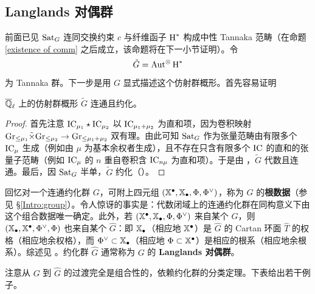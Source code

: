 
\subsection{Langlands 对偶群}\label{MV semiinfinite}

前面已见 ${\operatorname{Sat}}_G$ 连同交换约束 $c$ 与纤维函子 $\operatorname{H}^*$ 构成中性 Tannaka 范畴（在命题 \ref{existence of comm} 之后成立，该命题将在下一小节证明）。令
\[\tilde G={\operatorname{Aut}}^\otimes \operatorname{H}^*\]
为 Tannaka 群。下一步是用 $G$ 显式描述这个仿射群概形。首先容易证明

\begin{lem}
${\overline{{\mathbb Q}}_\ell}$ 上的仿射群概形 $\tilde G$ 连通且约化。
\end{lem}

\begin{proof}
首先注意 ${\operatorname{IC}}_{\mu_1}\star{\operatorname{IC}}_{\mu_2}$ 以 ${\operatorname{IC}}_{\mu_1+\mu_2}$ 为直和项，因为卷积映射 ${\operatorname{Gr}}_{\leq\mu_1}\tilde\times{\operatorname{Gr}}_{\leq \mu_2}\to {\operatorname{Gr}}_{\leq \mu_1+\mu_2}$ 双有理。由此可知 ${\operatorname{Sat}}_G$ 作为张量范畴由有限多个 ${\operatorname{IC}}_\mu$ 生成（例如由 $\mu$ 为基本余权者生成），且不存在只含有限多个 ${\operatorname{IC}}$ 的直和的张量子范畴（例如 ${\operatorname{IC}}_\mu$ 的 $n$ 重自卷积含 ${\operatorname{IC}}_{n\mu}$ 为直和项）。于是由 \cite[Proposition 2.20, Corollary 2.22]{DM}，$\tilde G$ 代数且连通。最后，因 ${\operatorname{Sat}}_G$ 半单，$\tilde G$ 约化（\cite[Proposition 2.23]{DM}）。
\end{proof}

回忆对一个连通约化群 $G$，可附上四元组 $(\mathbb{X}^\bullet,\mathbb{X}_\bullet,\Phi,\Phi^\vee)$，称为 $G$ 的\textbf{根数据}（参见 \S\ref{Intro:group}）。令人惊讶的事实是：代数闭域上的连通约化群在同构意义下由这个组合数据唯一确定。此外，若 $(\mathbb{X}^\bullet,\mathbb{X}_\bullet,\Phi,\Phi^\vee)$ 来自某个 $G$，则 $(\mathbb{X}_\bullet,\mathbb{X}^\bullet,\Phi^\vee,\Phi)$ 也来自某个 $\hat G$：即 $\mathbb{X}_\bullet$（相应地 $\mathbb{X}^\bullet$）是 $\hat G$ 的 Cartan 环面 $\hat T$ 的权格（相应地余权格），而 $\Phi^\vee\subset \mathbb{X}_\bullet$（相应地 $\Phi\subset\mathbb{X}^\bullet$）是相应的根系（相应地余根系）。综述见 \cite[\S~1,2]{Sp}。约化群 $\hat G$ 通常称为 $G$ 的 \textbf{Langlands 对偶群}。

注意从 $G$ 到 $\hat G$ 的过渡完全是组合性的，依赖约化群的分类定理。下表给出若干例子。

